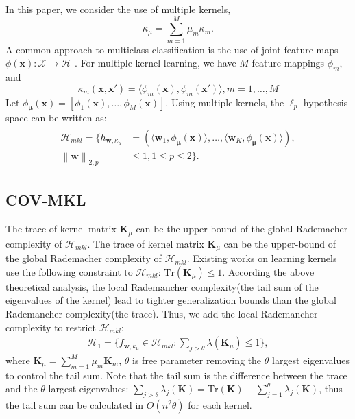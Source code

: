 \documentclass{article}
\begin{document}
In this paper, we consider the use of multiple kernels,
$$\kappa_\mu=\sum_{m=1}^M \mu_m\kappa_m.$$
A common approach to multiclass classification is the use of joint feature
maps $\phi(\mathbf x):\mathcal X \to \mathcal H$ \cite{TsochantaridisHJA04}.
For multiple kernel learning, we have $M$ feature mappings $\phi_m$, and
$$\kappa_m(\mathbf x,\mathbf x')=\langle \phi_m(\mathbf x), \phi_m(\mathbf x')\rangle, m=1,\ldots,M$$
Let $\phi_{\bm \mu}(\mathbf x)=[\phi_1(\mathbf x),\ldots,\phi_M(\mathbf x)]$.
Using multiple kernels, the $\ell_p$ hypothesis space can be written as:
 \begin{align*}
 \label{hypothspapcemkl}
   \begin{aligned}
   \mathcal{H}_{mkl}=\Big\{h_{\mathbf{w},\kappa_\mu}&=\left(\langle \mathbf w_1,\phi_{\bm \mu}(\mathbf x)\rangle,\ldots, \langle\mathbf w_K,\phi_{\bm \mu}(\mathbf x)\rangle\right),\\
   \left\|\mathbf  w \right\|_{2,p}&\leq 1, 1\leq p\leq 2
  \Big\}.
   \end{aligned}
 \end{align*}
\subsection{COV-MKL}
The trace of kernel matrix $\mathbf{K}_\mu$ can be the upper-bound of the global Rademacher complexity of $\mathcal{H}_{mkl}$.
The trace of kernel matrix $\mathbf{K}_\mu$ can be the upper-bound of the global Rademacher complexity of $\mathcal{H}_{mkl}$. Existing works on learning kernels \cite{LanckrietCBGJ02,BachLJ04,SonnenburgRSS06} use the following constraint to $\mathcal{H}_{mkl}$:
$\mathrm{Tr}(\mathbf{K}_\mu) \leq 1.$
According the above theoretical analysis, the local Rademancher complexity(the tail sum of the eigenvalues of the kernel) lead to tighter generalization bounds than the global Rademancher complexity(the trace). Thus, we add the local Rademancher complexity to restrict $\mathcal{H}_{mkl}$:
\begin{align}
    \mathcal{H}_{1}=\Big\{f_{\mathbf{w}, k_\mu} \in \mathcal{H}_{mkl}:\sum_{j > \theta} \lambda(\mathbf{K}_\mu) \leq 1\Big\},
\end{align}
where $\mathbf{K}_\mu=\sum_{m=1}^M \mu_m \mathbf{K}_m$,
$\theta$ is free parameter removing the $\theta$ largest eigenvalues to control the tail sum.
Note that the tail sum is the difference between the trace and
the $\theta$ largest eigenvalues: $\sum_{j>\theta}\lambda_j(\mathbf{K})=\mathrm{Tr}(\mathbf{K})-\sum_{j=1}^\theta\lambda_j(\mathbf{K})$,
thus the tail sum can be calculated in $O(n^2\theta)$ for each kernel.
\end{document}
